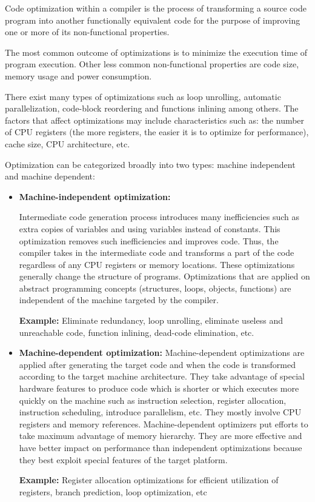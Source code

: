 Code optimization within a compiler is the process of transforming a source code program into another functionally equivalent code for the purpose of improving one or more of its non-functional properties. 

The most common outcome of optimizations is to minimize the execution time of program execution. Other less common non-functional properties are code size, memory usage and power consumption. 

There exist many types of optimizations such as loop unrolling, automatic parallelization, code-block reordering and functions inlining among others. The factors that affect optimizations may include characteristics such as: the number of CPU registers (the more registers, the easier it is to optimize for performance), cache size, CPU architecture, etc.

Optimization can be categorized broadly into two types: machine independent and machine dependent: 
\begin{itemize}
	
	\item \textbf{Machine-independent optimization:}
	
	Intermediate code generation process introduces many inefficiencies such as extra copies of variables and using variables instead of
	constants.
	This optimization removes such inefficiencies and improves code. Thus, the compiler takes in the intermediate code and transforms a part of the code regardless of any CPU registers or memory locations. These optimizations generally change the structure of programs.
	Optimizations that are applied on abstract programming concepts (structures, loops, objects, functions) are independent of the machine targeted by the compiler.
	
	\textbf{Example:} Eliminate redundancy, loop unrolling, eliminate useless and unreachable code, function inlining, dead-code elimination, etc.
	
	\item \textbf{Machine-dependent optimization:} 
	Machine-dependent optimizations are applied after generating the target code and when the code is transformed according to the target machine architecture. They take advantage of special hardware features to produce code which is shorter or which executes more quickly on the machine such as instruction selection, register allocation, instruction scheduling, introduce parallelism, etc.
	They mostly involve CPU registers and memory references. Machine-dependent optimizers put efforts to take maximum advantage of memory hierarchy. They are more effective and have better impact on performance than independent optimizations because they best exploit special features of the target platform.
	
	\textbf{Example:} Register allocation optimizations for efficient utilization of registers, branch prediction, loop optimization, etc
 
 
\end{itemize}
 


